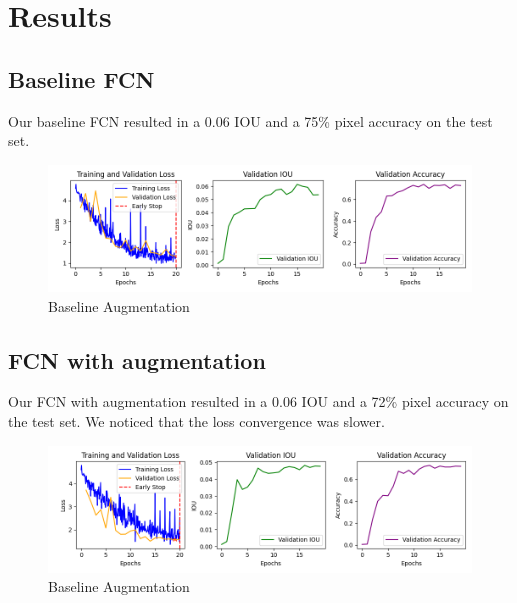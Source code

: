 \section*{Results}


\subsection*{Baseline FCN}

Our baseline FCN resulted in a 0.06 IOU and a 75\% pixel accuracy on the test set.

\begin{figure}[H]
	\centering
	\includegraphics[width=\textwidth]{plots/baseline}
	\caption{Baseline Augmentation}
	\label{fig:baseline}
\end{figure}

\subsection*{FCN with augmentation}

Our FCN with augmentation resulted in a 0.06 IOU and a 72\% pixel accuracy on the test set. We noticed that the loss convergence
was slower.

\begin{figure}[H]
	\centering
	\includegraphics[width=\textwidth]{plots/baseline_augmentation}
	\caption{Baseline Augmentation}
	\label{fig:baseline_aug}
\end{figure}

